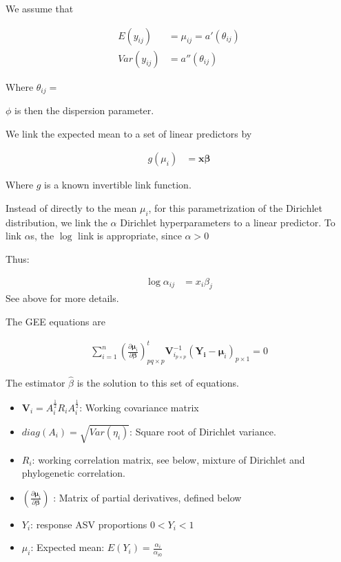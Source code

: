 \documentclass[10pt]{article}
\theoremstyle{definition}
\begin{document}
We assume that

\begin{align*}
  E(y_{ij}) &= \mu_{ij} = a'(\theta_{ij})\\
  Var(y_{ij}) &= a''(\theta_{ij})
\end{align*}

Where $\theta_{ij} = $

$\phi$ is then the dispersion parameter.


We link the expected mean to a set of linear predictors by

\begin{align*}
  g(\mu_i) &= \mathbf{x}\boldsymbol\beta
\end{align*}

Where $g$ is a known invertible link function.

Instead of directly to the mean $\mu_i$, for this parametrization of the Dirichlet distribution, we link the $\alpha$ Dirichlet hyperparameters to a linear predictor. To link $\alpha$s, the $\log$ link is appropriate, since $\alpha > 0$

Thus:

\begin{align*}
  \log \alpha_{ij} &= x_i \beta_j
\end{align*}
See above for more details.

The GEE equations are

\begin{align*}
  \sum_{i = 1}^n  \left(\frac{\partial  \boldsymbol\mu_i }{\partial \boldsymbol\beta }\right)_{pq \times p}^t\mathbf{V}_{i_{p \times p}}^{-1}(\mathbf{Y_i} - \boldsymbol\mu_i)_{p \times 1} = 0
\end{align*}

The estimator $\hat\beta$ is the solution to this set of equations.


\begin{itemize}
  \item $\boldsymbol V_i = A_i^{\tfrac{1}{2}}R_iA_i^{\tfrac{1}{2}}$: Working covariance matrix
  \item $diag(A_i) = \sqrt{Var(\eta_{i})}$: Square root of Dirichlet variance.
  \item $R_i$: working correlation matrix, see below, mixture of Dirichlet and phylogenetic correlation.
  \item $\left(\frac{\partial  \boldsymbol\mu_i }{\partial \boldsymbol\beta }\right)$ : Matrix of partial derivatives, defined below
  \item $Y_i$: response ASV proportions $0 < Y_i < 1$
  \item $\mu_i$: Expected mean: $E(Y_i) = \frac{\alpha_i}{\alpha_{i0}}$
\end{itemize}
\end{document}
